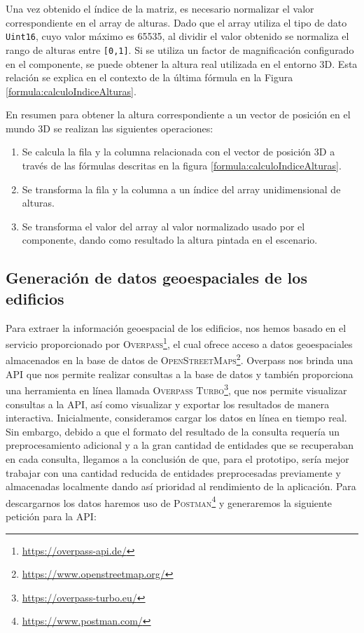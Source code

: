 \documentclass[a4paper, 11pt]{book}
\begin{document}
Una vez obtenido el índice de la matriz, es necesario normalizar el valor correspondiente en el array de alturas. Dado que el array utiliza el tipo de dato \texttt{Uint16}, cuyo valor máximo es 65535, al dividir el valor obtenido se normaliza el rango de alturas entre \texttt{[0,1]}. Si se utiliza un factor de magnificación configurado en el componente, se puede obtener la altura real utilizada en el entorno 3D. Esta relación se explica en el contexto de la última fórmula en la Figura \ref{formula:calculoIndiceAlturas}.

En resumen para obtener la altura correspondiente a un vector de posición en el mundo 3D se realizan las siguientes operaciones:
\begin{enumerate}
	\item Se calcula la fila y la columna relacionada con el vector de posición 3D a través de las fórmulas descritas en la figura \ref{formula:calculoIndiceAlturas}.
	\item Se transforma la fila y la columna a un índice del array unidimensional de alturas.
	\item Se transforma el valor del array al valor normalizado usado por el componente, dando como resultado la altura pintada en el escenario.
\end{enumerate}

\subsection{Generación de datos geoespaciales de los edificios}
\label{subsec:buildingData}
Para extraer la información \gls{geoespacial} de los edificios, nos hemos basado en el servicio proporcionado por \textsc{Overpass}\footnote{\url{https://overpass-api.de/}}, el cual ofrece acceso a datos geoespaciales almacenados en la base de datos de \textsc{OpenStreetMaps}\footnote{\url{https://www.openstreetmap.org/}}. 
Overpass nos brinda una \textsc{API} que nos permite realizar consultas a la base de datos y también proporciona una herramienta en línea llamada \textsc{Overpass Turbo}\footnote{\url{https://overpass-turbo.eu/}}, que nos permite visualizar consultas a la \textsc{API}, así como visualizar y exportar los resultados de manera interactiva.
Inicialmente, consideramos cargar los datos en línea en tiempo real. Sin embargo, debido a que el formato del resultado de la consulta requería un preprocesamiento adicional y a la gran cantidad de entidades que se recuperaban en cada consulta, llegamos a la conclusión de que, para el prototipo, sería mejor trabajar con una cantidad reducida de entidades preprocesadas previamente y almacenadas localmente dando así prioridad al rendimiento de la aplicación.
Para descargarnos los datos haremos uso de \textsc{Postman}\footnote{\url{https://www.postman.com/}} y generaremos la siguiente petición para la \textsc{API}:
\end{document}
